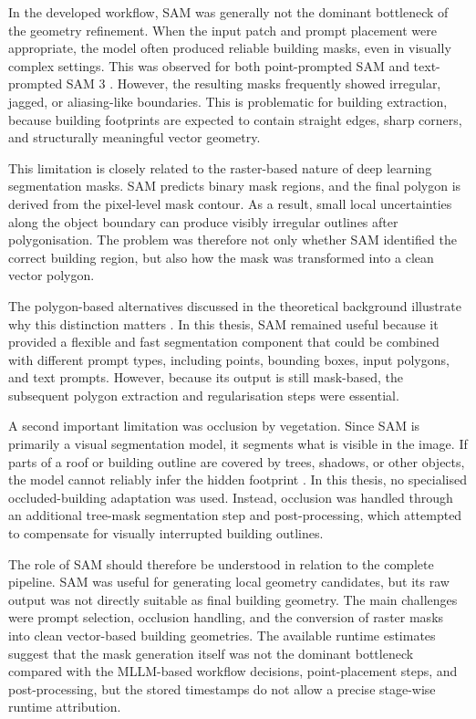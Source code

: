 In the developed workflow, SAM was generally not the dominant bottleneck of the geometry refinement. When the input patch and prompt placement were appropriate, the model often produced reliable building masks, even in visually complex settings. This was observed for both point-prompted SAM and text-prompted SAM 3 \citep{kirillov2023segment, papersam3}. However, the resulting masks frequently showed irregular, jagged, or aliasing-like boundaries. This is problematic for building extraction, because building footprints are expected to contain straight edges, sharp corners, and structurally meaningful vector geometry.

This limitation is closely related to the raster-based nature of deep learning segmentation masks. SAM predicts binary mask regions, and the final polygon is derived from the pixel-level mask contour. As a result, small local uncertainties along the object boundary can produce visibly irregular outlines after polygonisation. The problem was therefore not only whether SAM identified the correct building region, but also how the mask was transformed into a clean vector polygon.

The polygon-based alternatives discussed in the theoretical background illustrate why this distinction matters \citep{girard2021polygonalbuildingsegmentationframe, pix2poly}. In this thesis, SAM remained useful because it provided a flexible and fast segmentation component that could be combined with different prompt types, including points, bounding boxes, input polygons, and text prompts. However, because its output is still mask-based, the subsequent polygon extraction and regularisation steps were essential.

A second important limitation was occlusion by vegetation. Since SAM is primarily a visual segmentation model, it segments what is visible in the image. If parts of a roof or building outline are covered by trees, shadows, or other objects, the model cannot reliably infer the hidden footprint \citep{tai2025segment}. In this thesis, no specialised occluded-building adaptation was used. Instead, occlusion was handled through an additional tree-mask segmentation step and post-processing, which attempted to compensate for visually interrupted building outlines.

The role of SAM should therefore be understood in relation to the complete pipeline. SAM was useful for generating local geometry candidates, but its raw output was not directly suitable as final building geometry. The main challenges were prompt selection, occlusion handling, and the conversion of raster masks into clean vector-based building geometries. The available runtime estimates suggest that the mask generation itself was not the dominant bottleneck compared with the MLLM-based workflow decisions, point-placement steps, and post-processing, but the stored timestamps do not allow a precise stage-wise runtime attribution.

